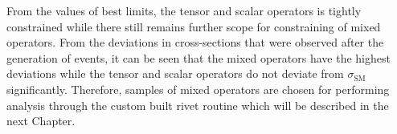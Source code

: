 From the values of best limits, the tensor and scalar operators is tightly constrained while there still remains further scope for constraining of mixed operators. From the deviations in cross-sections that were observed after the generation of events, it can be seen that the mixed operators have the highest deviations while the tensor and scalar operators do not deviate from $\sigma_\text{SM}$ significantly. Therefore, samples of mixed operators are chosen for performing analysis through the custom built rivet routine which will be described in the next Chapter.


%
%
%
